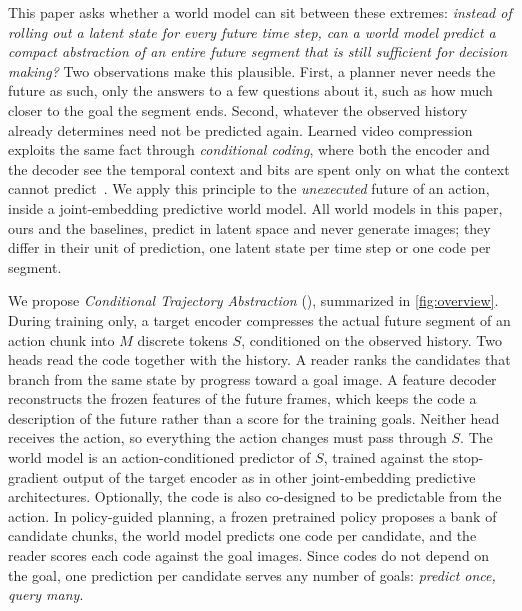 This paper asks whether a world model can sit between these extremes: \emph{instead of rolling out a latent state for every future time step, can a world model predict a compact abstraction of an entire future segment that is still sufficient for decision making?}
Two observations make this plausible.
First, a planner never needs the future as such, only the answers to a few questions about it, such as how much closer to the goal the segment ends.
Second, whatever the observed history already determines need not be predicted again.
Learned video compression exploits the same fact through \emph{conditional coding}, where both the encoder and the decoder see the temporal context and bits are spent only on what the context cannot predict~\cite{li2021dcvc}.
We apply this principle to the \emph{unexecuted} future of an action, inside a joint-embedding predictive world model.
All world models in this paper, ours and the baselines, predict in latent space and never generate images; they differ in their unit of prediction, one latent state per time step or one code per segment.

We propose \emph{Conditional Trajectory Abstraction} (\method), summarized in \cref{fig:overview}.
During training only, a target encoder compresses the actual future segment of an action chunk into $M$ discrete tokens $S$, conditioned on the observed history.
Two heads read the code together with the history.
A reader ranks the candidates that branch from the same state by progress toward a goal image.
A feature decoder reconstructs the frozen features of the future frames, which keeps the code a description of the future rather than a score for the training goals.
Neither head receives the action, so everything the action changes must pass through $S$.
The world model is an action-conditioned predictor of $S$, trained against the stop-gradient output of the target encoder as in other joint-embedding predictive architectures.
Optionally, the code is also co-designed to be predictable from the action.
In policy-guided planning, a frozen pretrained policy proposes a bank of candidate chunks, the world model predicts one code per candidate, and the reader scores each code against the goal images.
Since codes do not depend on the goal, one prediction per candidate serves any number of goals: \emph{predict once, query many}.

